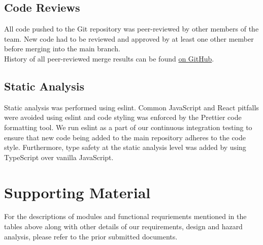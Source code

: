 \documentclass[fullpage]{article}
\begin{document}
\subsection{Code Reviews}

All code pushed to the Git repository was peer-reviewed by other members of the team. New code had to be reviewed and approved by at least one other member before merging into the main branch.\\
History of all peer-reviewed merge results can be found \href{https://github.com/calebmech/Book-Bazar/pulls?q=is\%3Apr+is\%3Amerged}{on GitHub}.

\subsection{Static Analysis}
Static analysis was performed using eslint. Common JavaScript and React pitfalls were avoided using eslint and code styling was enforced by the Prettier code formatting tool. We run eslint as a part of our continuous integration testing to ensure that new code being added to the main repository adheres to the code style. Furthermore, type safety at the static analysis level was added by using TypeScript over vanilla JavaScript.

\section{Supporting Material}
For the descriptions of modules and functional requriements mentioned in the tables above along with other details of our requirements, design and hazard analysis, please refer to the prior submitted documents.
\begin{comment}
\begin{thebibliography}{9}
\bibitem{website}
S. Liu, “Canada most popular desktop browsers 2021,” Statista, 04-Oct-2021. [Online]. Available: https://www.statista.com/statistics/499462/most-popular-desktop-browsers-in-canada-by-market-share/. [Accessed: 17-Oct-2021]. 
\end{thebibliography}
\end{comment}
\end{document}
